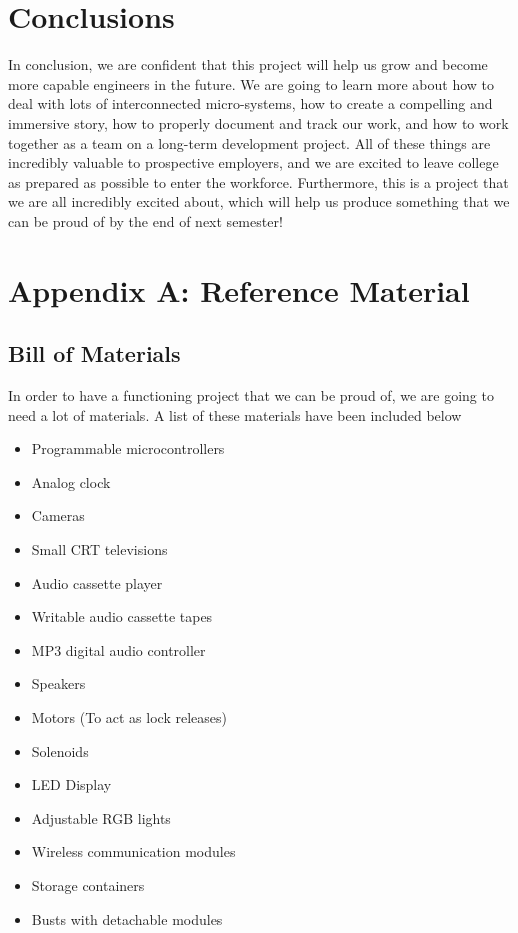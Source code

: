 \documentclass[conference]{IEEEtran}
\begin{document}
\section{Conclusions}
In conclusion, we are confident that this project will help us grow and become more capable
engineers in the future. We are going to learn more about how to deal with lots of interconnected
micro-systems, how to create a compelling and immersive story, how to properly document and track
our work, and how to work together as a team on a long-term development project. All of these things
are incredibly valuable to prospective employers, and we are excited to leave college as prepared
as possible to enter the workforce. Furthermore, this is a project that we are all incredibly excited
about, which will help us produce something that we can be proud of by the end of next semester!

\section{Appendix A: Reference Material}

\subsection{Bill of Materials}
In order to have a functioning project that we can be proud of, we are going to need a lot of materials.
A list of these materials have been included below
\begin{itemize}
    \item Programmable microcontrollers
    \item Analog clock
    \item Cameras
    \item Small CRT televisions
    \item Audio cassette player
    \item Writable audio cassette tapes
    \item MP3 digital audio controller
    \item Speakers
    \item Motors (To act as lock releases)
    \item Solenoids
    \item LED Display
    \item Adjustable RGB lights
    \item Wireless communication modules
    \item Storage containers
    \item Busts with detachable modules
\end{itemize}
\end{document}
